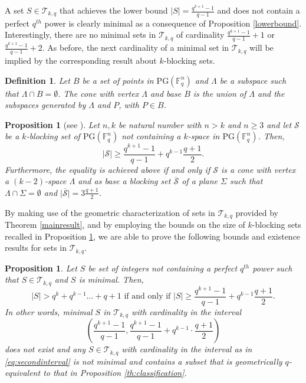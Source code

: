 \documentclass[12pt]{amsart}
\newtheorem{definition}{Definition}
\newtheorem{proposition}[theorem]{Proposition}
\newcommand{\F}{{\mathbb F}}
\newcommand{\PG}{\mathrm{PG}}
\begin{document}
A set $S \in\mathcal{T}_{k,q}$ that achieves the lower bound $\lvert S \rvert = \frac{q^{k+1} - 1}{q - 1}$ and does not contain a perfect $q^{th}$ power is clearly minimal as a consequence of Proposition \ref{lowerbound}. Interestingly, there are no minimal sets in $\mathcal{T}_{k,q}$ of cardinality $\frac{q^{k+1} - 1}{q - 1} + 1$ or $\frac{q^{k+1} - 1}{q - 1} + 2$. As before, the next cardinality of a minimal set in $\mathcal{T}_{k,q}$ will be implied by the corresponding result about $k$-blocking sets. 

\begin{definition}
    Let $B$ be a set of points in $\PG(\F_q^n)$ and $\Lambda$ be a subspace such that $\Lambda \cap B = \emptyset$.  The \emph{cone} with vertex $\Lambda$ and base $B$ is the union of $\Lambda$ and the subspaces generated by $\Lambda$ and $P$, with $P \in B$.
\end{definition}

\begin{proposition} 
[see \cite{heim1996blockierende}] 
\label{th:secondsmallest}
    Let $n, k$ be natural number with $n > k$ and $n \geq 3$ and let $\mathcal{S}$ be a $k$-blocking set of $\PG(\F_q^n)$ not containing a $k$-space in $\PG(\F_q^n)$. Then, \[\lvert \mathcal{S} \rvert \geq \frac{q^{k+1}-1}{q-1}+q^{k-1}\frac{q+1}{2}.\]  Furthermore, the equality is achieved above if and only if $\mathcal{S}$ is a cone with vertex a $(k-2)$-space $\Lambda$ and as base a blocking set $\overline{\mathcal{S}}$ of a plane $\Sigma$ such that $\Lambda \cap \Sigma = \emptyset$ and $\lvert \overline{\mathcal{S}} \rvert = 3 \frac{q+1}{2}$.
\end{proposition}


By making use of the geometric characterization of sets in $\mathcal{T}_{k,q}$ provided by Theorem \ref{mainresult}, and by employing the bounds on the size of $k$-blocking sets recalled in Proposition \ref{th:secondsmallest}, we are able to prove the following bounds and existence results for sets in $\mathcal{T}_{k,q}$.


\begin{proposition}
    Let $S$ be set of integers not containing a perfect $q^{th}$ power such that $S \in \mathcal{T}_{k,q}$ and $S$ is minimal. 
    Then, \[\lvert S \rvert >q^k+ q^{k-1} \ldots +q+1 \text{   if and only if   }
    \lvert S \rvert \geq \frac{q^{k+1}-1}{q-1}+q^{k-1}\frac{q+1}{2}.
    \]
In other words, minimal $S$ in $\mathcal{T}_{k,q}$ with cardinality in the interval 
\begin{equation} \label{eq:secondinterval}
\left(\frac{q^{k+1}-1}{q-1},  \frac{q^{k+1}-1}{q-1}+q^{k-1}\cdot \frac{q+1}{2} \right)
\end{equation}
does not exist and any $S \in\mathcal{T}_{k,q}$ with cardinality in the interval as in \eqref{eq:secondinterval} is not minimal and contains a subset that is geometrically $q$-equivalent to that in Proposition \ref{th:classification}.
\end{proposition}
\end{document}
